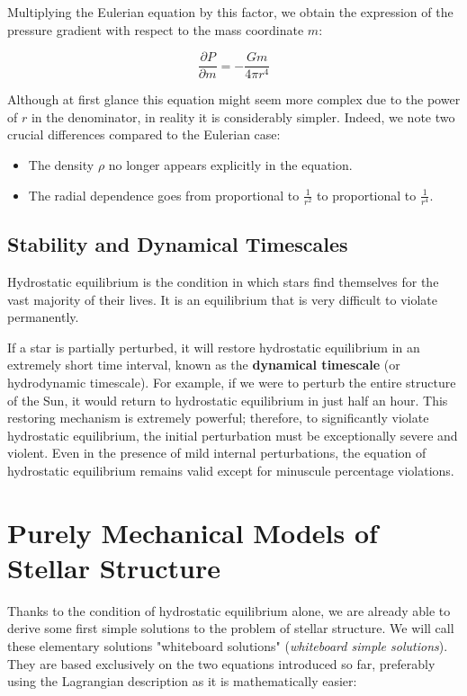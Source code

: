 Multiplying the Eulerian equation by this factor, we obtain the expression of the pressure gradient with respect to the mass coordinate $m$:

\begin{equation}
\frac{\partial P}{\partial m} = -\frac{G m}{4\pi r^4}
\end{equation}

Although at first glance this equation might seem more complex due to the power of $r$ in the denominator, in reality it is considerably simpler. Indeed, we note two crucial differences compared to the Eulerian case:
\begin{itemize}
\item The density $\rho$ no longer appears explicitly in the equation.
\item The radial dependence goes from proportional to $\frac{1}{r^2}$ to proportional to $\frac{1}{r^4}$.
\end{itemize}

\subsection{Stability and Dynamical Timescales}

Hydrostatic equilibrium is the condition in which stars find themselves for the vast majority of their lives. It is an equilibrium that is very difficult to violate permanently.

If a star is partially perturbed, it will restore hydrostatic equilibrium in an extremely short time interval, known as the \textbf{dynamical timescale} (or hydrodynamic timescale). For example, if we were to perturb the entire structure of the Sun, it would return to hydrostatic equilibrium in just half an hour. This restoring mechanism is extremely powerful; therefore, to significantly violate hydrostatic equilibrium, the initial perturbation must be exceptionally severe and violent. Even in the presence of mild internal perturbations, the equation of hydrostatic equilibrium remains valid except for minuscule percentage violations.

\section{Purely Mechanical Models of Stellar Structure}

Thanks to the condition of hydrostatic equilibrium alone, we are already able to derive some first simple solutions to the problem of stellar structure. We will call these elementary solutions "whiteboard solutions" (\textit{whiteboard simple solutions}). They are based exclusively on the two equations introduced so far, preferably using the Lagrangian description as it is mathematically easier:

